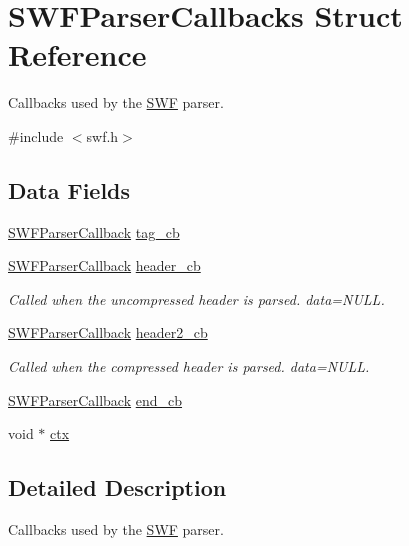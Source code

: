 \hypertarget{struct_s_w_f_parser_callbacks}{}\section{S\+W\+F\+Parser\+Callbacks Struct Reference}
\label{struct_s_w_f_parser_callbacks}


Callbacks used by the \hyperlink{struct_s_w_f}{S\+W\+F} parser.  




{\ttfamily \#include $<$swf.\+h$>$}

\subsection*{Data Fields}
\begin{DoxyCompactItemize}
\item 
\hyperlink{swf_8h_aec53079c0d74b3b4db19ec05c373491a}{S\+W\+F\+Parser\+Callback} \hyperlink{struct_s_w_f_parser_callbacks_a898af2d0db9d2d038e4d9c039ea91ac2}{tag\+\_\+cb}
\item 
\hyperlink{swf_8h_aec53079c0d74b3b4db19ec05c373491a}{S\+W\+F\+Parser\+Callback} \hyperlink{struct_s_w_f_parser_callbacks_a894666f68df70f79b7b2bed33cccf498}{header\+\_\+cb}
\begin{DoxyCompactList}\small\item\em Called when the uncompressed header is parsed. data=N\+U\+L\+L. \end{DoxyCompactList}\item 
\hyperlink{swf_8h_aec53079c0d74b3b4db19ec05c373491a}{S\+W\+F\+Parser\+Callback} \hyperlink{struct_s_w_f_parser_callbacks_a21beaa520990137cfe64ee20d5eb6054}{header2\+\_\+cb}
\begin{DoxyCompactList}\small\item\em Called when the compressed header is parsed. data=N\+U\+L\+L. \end{DoxyCompactList}\item 
\hyperlink{swf_8h_aec53079c0d74b3b4db19ec05c373491a}{S\+W\+F\+Parser\+Callback} \hyperlink{struct_s_w_f_parser_callbacks_a31cb75f39add22bb824685d6d7ba07a1}{end\+\_\+cb}
\item 
void $\ast$ \hyperlink{struct_s_w_f_parser_callbacks_a580259560295835647b2ac312addaf9c}{ctx}
\end{DoxyCompactItemize}


\subsection{Detailed Description}
Callbacks used by the \hyperlink{struct_s_w_f}{S\+W\+F} parser. 

